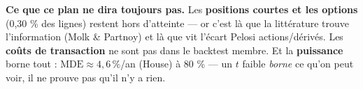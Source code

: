 \documentclass[11pt,a4paper]{article}
\begin{document}
\vspace{1mm}
\begin{mdframed}[linecolor=grisf, backgroundcolor=grisf!6, linewidth=0.7pt, roundcorner=3pt]
\small\textbf{Ce que ce plan ne dira toujours pas.}
Les \textbf{positions courtes et les options} (0,30 \% des lignes) restent hors d'atteinte --- or c'est là que la littérature trouve l'information (Molk \& Partnoy) et là que vit l'écart Pelosi actions/dérivés.
Les \textbf{coûts de transaction} ne sont pas dans le backtest membre.
Et la \textbf{puissance} borne tout : $\mathrm{MDE}\approx 4{,}6\,\%$/an (House) à 80 \% --- un $t$ faible \emph{borne} ce qu'on peut voir, il ne prouve pas qu'il n'y a rien.
\end{mdframed}
\end{document}
